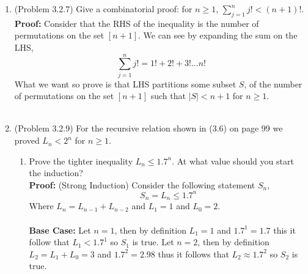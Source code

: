 \documentclass{amsart}
\begin{document}
\begin{enumerate}
\item (Problem 3.2.7) Give a combinatorial proof: for $n \geq 1$, $\displaystyle{\sum_{j=1}^nj!<(n+1)!}.$\\

\textbf{Proof:} Consider that the RHS of the inequality is the number of permutations on the set $[n+1]$. We can see by expanding the sum on the LHS,
\begin{equation*}
\sum_{j=1}^nj! = 1!+2!+3!...n!
\end{equation*}
What we want so prove is that LHS partitions some subset $S$, of the number of permutations on the set $[n+1]$ such that $|S| < n+1$ for $n \geq 1$. \\\\






\item (Problem 3.2.9)  For the recursive relation shown in (3.6) on page 99 we proved $L_n < 2^n$ for $n \geq 1.$\\
	\begin{enumerate}
	\item Prove the tighter inequality $L_n \leq 1.7^n.$ At what value should you start the induction?\\
	
\textbf{Proof:} (Strong Induction) Consider the following statement $S_n$,
\begin{equation*}
S_n=L_n \leq 1.7^n
\end{equation*}
Where $L_n = L_{n-1}+L_{n-2}$ and $L_1 = 1$ and $L_0 = 2$.\\\\
\textbf{Base Case:}
Let $n = 1$, then by definition $L_1 = 1$ and $1.7^1 = 1.7$ this it follow that $L_1 < 1.7^1$ so $S_1$ is true.
Let $n = 2$, then by definition $L_2 = L_1 + L_0 = 3$ and $1.7^2 = 2.98$ thus it follows that $L_2 \approx 1.7^2$ so $S_2$ is true.\\\\


\end{enumerate}
\end{enumerate}
\end{document}
